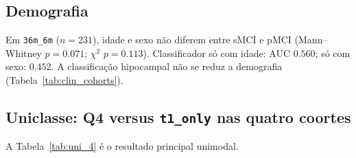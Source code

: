 \documentclass[review]{elsarticle}
\newcommand{\code}[1]{\texttt{#1}}
\begin{document}
\subsection{Demografia}
\label{subsec:demo}

Em \code{36m\_6m} ($n=231$), idade e sexo não diferem entre sMCI e pMCI (Mann--Whitney $p=0.071$; $\chi^2$ $p=0.113$).
Classificador só com idade: AUC $0.560$; só com sexo: $0.452$.
A classificação hipocampal não se reduz a demografia (Tabela~\ref{tab:clin_cohorts}).

\subsection{Uniclasse: Q4 versus \texorpdfstring{\code{t1\_only}}{t1\_only} nas quatro coortes}
\label{subsec:unimodal}

A Tabela~\ref{tab:uni_4} é o resultado principal unimodal.
\end{document}
